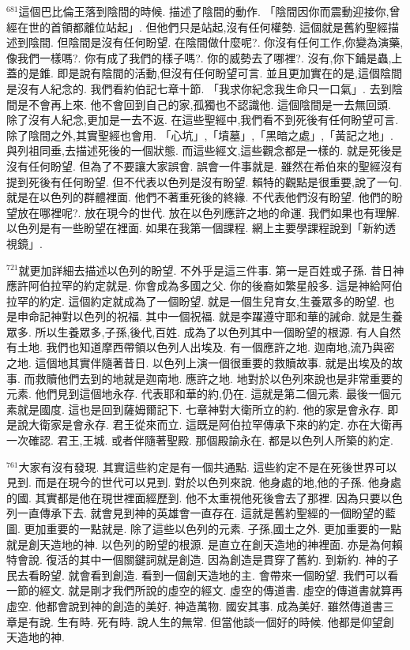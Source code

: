 \documentclass{book}
\begin{document}
$^{681}$這個巴比倫王落到陰間的時候.
描述了陰間的動作.
「陰間因你而震動迎接你,曾經在世的首領都離位站起」.
但他們只是站起,沒有任何權勢.
這個就是舊約聖經描述到陰間.
但陰間是沒有任何盼望.
在陰間做什麼呢?.
你沒有任何工作,你變為演藥,像我們一樣嗎?.
你有成了我們的樣子嗎?.
你的威勢去了哪裡?.
沒有,你下鋪是蟲,上蓋的是錐.
即是說有陰間的活動,但沒有任何盼望可言.
並且更加實在的是,這個陰間是沒有人紀念的.
我們看約伯記七章十節.
「我求你紀念我生命只一口氣」.
去到陰間是不會再上來.
他不會回到自己的家,孤獨也不認識他.
這個陰間是一去無回頭.
除了沒有人紀念,更加是一去不返.
在這些聖經中,我們看不到死後有任何盼望可言.
除了陰間之外,其實聖經也會用.
「心坑」,「墳墓」,「黑暗之處」,「黃記之地」.
與列祖同垂,去描述死後的一個狀態.
而這些經文,這些觀念都是一樣的.
就是死後是沒有任何盼望.
但為了不要讓大家誤會.
誤會一件事就是.
雖然在希伯來的聖經沒有提到死後有任何盼望.
但不代表以色列是沒有盼望.
賴特的觀點是很重要,說了一句.
就是在以色列的群體裡面.
他們不著重死後的終緣.
不代表他們沒有盼望.
他們的盼望放在哪裡呢?.
放在現今的世代.
放在以色列應許之地的命運.
我們如果也有理解.
以色列是有一些盼望在裡面.
如果在我第一個課程.
網上主要學課程說到「新約透視鏡」.

$^{721}$就更加詳細去描述以色列的盼望.
不外乎是這三件事.
第一是百姓或子孫.
昔日神應許阿伯拉罕的約定就是.
你會成為多國之父.
你的後裔如繁星般多.
這是神給阿伯拉罕的約定.
這個約定就成為了一個盼望.
就是一個生兒育女,生養眾多的盼望.
也是申命記神對以色列的祝福.
其中一個祝福.
就是李躍遵守耶和華的誡命.
就是生養眾多.
所以生養眾多,子孫,後代,百姓.
成為了以色列其中一個盼望的根源.
有人自然有土地.
我們也知道摩西帶領以色列人出埃及.
有一個應許之地.
迦南地,流乃與密之地.
這個地其實伴隨著昔日.
以色列上演一個很重要的救贖故事.
就是出埃及的故事.
而救贖他們去到的地就是迦南地.
應許之地.
地對於以色列來說也是非常重要的元素.
他們見到這個地永存.
代表耶和華的約,仍在.
這就是第二個元素.
最後一個元素就是國度.
這也是回到薩姆爾記下.
七章神對大衛所立的約.
他的家是會永存.
即是說大衛家是會永存.
君王從來而立.
這既是阿伯拉罕傳承下來的約定.
亦在大衛再一次確認.
君王,王城.
或者伴隨著聖殿.
那個殿諭永在.
都是以色列人所築的約定.

$^{761}$大家有沒有發現.
其實這些約定是有一個共通點.
這些約定不是在死後世界可以見到.
而是在現今的世代可以見到.
對於以色列來說.
他身處的地,他的子孫.
他身處的國.
其實都是他在現世裡面經歷到.
他不太重視他死後會去了那裡.
因為只要以色列一直傳承下去.
就會見到神的英雄會一直存在.
這就是舊約聖經的一個盼望的藍圖.
更加重要的一點就是.
除了這些以色列的元素.
子孫,國土之外.
更加重要的一點就是創天造地的神.
以色列的盼望的根源.
是直立在創天造地的神裡面.
亦是為何賴特會說.
復活的其中一個關鍵詞就是創造.
因為創造是貫穿了舊約.
到新約.
神的子民去看盼望.
就會看到創造.
看到一個創天造地的主.
會帶來一個盼望.
我們可以看一節的經文.
就是剛才我們所說的虛空的經文.
虛空的傳道書.
虛空的傳道書就算再虛空.
他都會說到神的創造的美好.
神造萬物.
國安其事.
成為美好.
雖然傳道書三章是有說.
生有時.
死有時.
說人生的無常.
但當他談一個好的時候.
他都是仰望創天造地的神.
\end{document}
